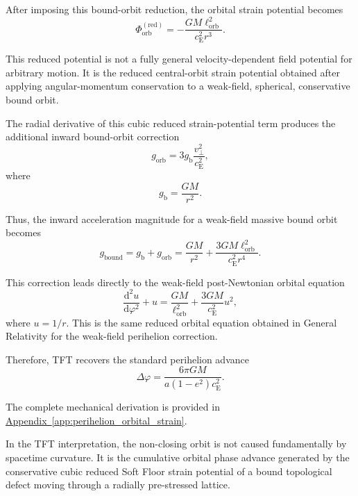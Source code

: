 After imposing this bound-orbit reduction, the orbital strain potential becomes
\begin{equation}
    \Phi_{\mathrm{orb}}^{(\mathrm{red})} = - \frac{GM\ell_{\mathrm{orb}}^2}{c_{\mathrm{E}}^2r^3}.
\end{equation}

This reduced potential is not a fully general velocity-dependent field potential for arbitrary motion. It is the reduced central-orbit strain potential obtained after applying angular-momentum conservation to a weak-field, spherical, conservative bound orbit.

The radial derivative of this cubic reduced strain-potential term produces the additional inward bound-orbit correction
\begin{equation}
    g_{\mathrm{orb}} = 3g_{\mathrm{b}} \frac{v_\perp^2}{c_{\mathrm{E}}^2},
\end{equation}
where
\begin{equation}
    g_{\mathrm{b}} = \frac{GM}{r^2}.
\end{equation}

Thus, the inward acceleration magnitude for a weak-field massive bound orbit becomes
\begin{equation}
    g_{\mathrm{bound}} = g_{\mathrm{b}} + g_{\mathrm{orb}} = \frac{GM}{r^2} + \frac{3GM\ell_{\mathrm{orb}}^2}{c_{\mathrm{E}}^2r^4}.
\end{equation}

This correction leads directly to the weak-field post-Newtonian orbital equation
\begin{equation}
    \frac{\mathrm{d}^2u}{\mathrm{d}\varphi^2} + u = \frac{GM}{\ell_{\mathrm{orb}}^2} + \frac{3GM}{c_{\mathrm{E}}^2}u^2,
\end{equation}
where $u=1/r$. This is the same reduced orbital equation obtained in General Relativity for the weak-field perihelion correction.

Therefore, TFT recovers the standard perihelion advance
\begin{equation}
    \Delta\varphi = \frac{6\pi GM}{a(1-e^2)c_{\mathrm{E}}^2}.
\end{equation}

The complete mechanical derivation is provided in \hyperref[app:perihelion_orbital_strain]{Appendix~\ref*{app:perihelion_orbital_strain}}.

In the TFT interpretation, the non-closing orbit is not caused fundamentally by spacetime curvature. It is the cumulative orbital phase advance generated by the conservative cubic reduced Soft Floor strain potential of a bound topological defect moving through a radially pre-stressed lattice.

